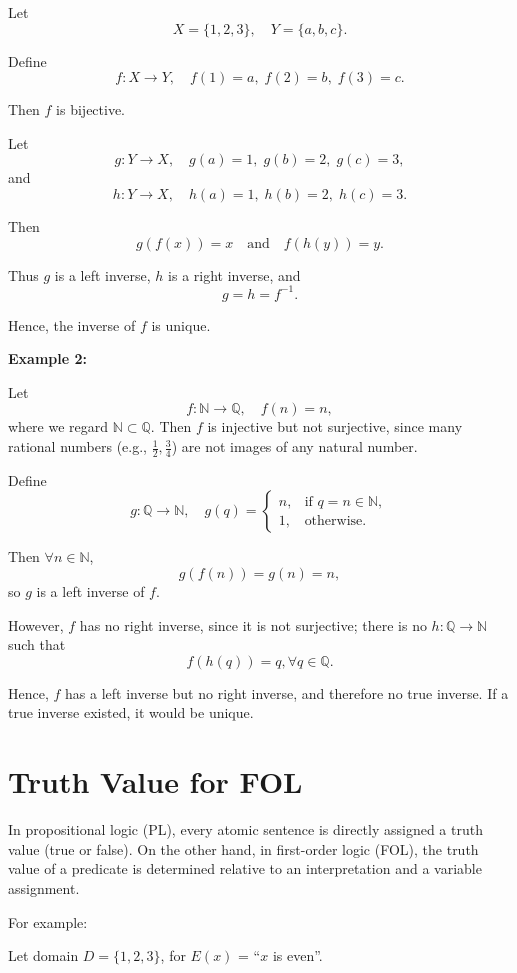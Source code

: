 \documentclass[12pt,a4paper,openany]{article}
\begin{document}
Let  
\[
X = \{1, 2, 3\}, \quad Y = \{a, b, c\}.
\]

Define  
\[
f : X \to Y, \quad f(1) = a, \; f(2) = b, \; f(3) = c.
\]

Then $f$ is bijective.

Let  
\[
g : Y \to X, \quad g(a) = 1, \; g(b) = 2, \; g(c) = 3,
\]
and  
\[
h : Y \to X, \quad h(a) = 1, \; h(b) = 2, \; h(c) = 3.
\]

Then  
\[
g(f(x)) = x \quad \text{and} \quad f(h(y)) = y.
\]

Thus $g$ is a left inverse, $h$ is a right inverse, and  
\[
g = h = f^{-1}.
\]

Hence, the inverse of $f$ is unique.

\textbf{Example 2:} 

Let  
\[
f : \mathbb{N} \to \mathbb{Q}, \quad f(n) = n,
\]
where we regard $\mathbb{N} \subset \mathbb{Q}$. Then $f$ is injective but not surjective, since many rational numbers (e.g., $\frac{1}{2}, \frac{3}{4}$) are not images of any natural number.

Define  
\[
g : \mathbb{Q} \to \mathbb{N}, \quad
g(q) = 
\begin{cases}
n, & \text{if } q = n \in \mathbb{N}, \\
1, & \text{otherwise}.
\end{cases}
\]

Then $\forall n \in \mathbb{N}$,  
\[
g(f(n)) = g(n) = n,
\]
so $g$ is a left inverse of $f$.

However, $f$ has no right inverse, since it is not surjective; there is no $h : \mathbb{Q} \to \mathbb{N}$ such that  
\[
f(h(q)) = q, \forall q \in \mathbb{Q}.
\]

Hence, $f$ has a left inverse but no right inverse, and therefore no true inverse. If a true inverse existed, it would be unique.


\section{Truth Value for FOL}

In propositional logic (PL), every atomic sentence is directly assigned
a truth value (true or false). On the other hand, in first-order logic
(FOL), the truth value of a predicate is determined relative to an
interpretation and a variable assignment.

For example:

Let domain \(D = \{1,2,3\}\), for \(E(x)\) = ``\(x\) is even''.
\end{document}

